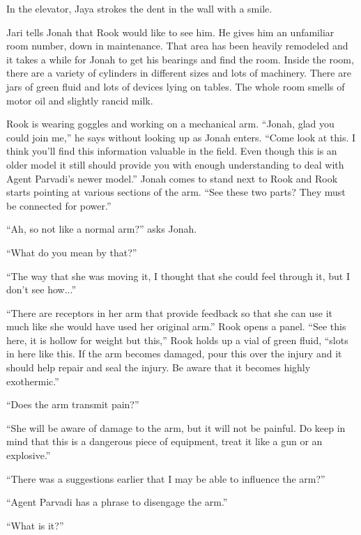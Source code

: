 In the elevator, Jaya strokes the dent in the wall with a smile.





Jari tells Jonah that Rook would like to see him.  He gives him an unfamiliar room number, down in maintenance.  That area has been heavily remodeled and it takes a while for Jonah to get his bearings and find the room.  Inside the room, there are a variety of cylinders in different sizes and lots of machinery.  There are jars of green fluid and lots of devices lying on tables. The whole room smells of motor oil and slightly rancid milk.



Rook is wearing goggles and working on a mechanical arm.  ``Jonah, glad you could join me,'' he says without looking up as Jonah enters.  ``Come look at this.  I think you'll find this information valuable in the field.  Even though this is an older model it still should provide you with enough understanding to deal with Agent Parvadi's newer model.''  Jonah comes to stand next to Rook and Rook starts pointing at various sections of the arm. ``See these two parts?  They must be connected for power.''

``Ah, so not like a normal arm?'' asks Jonah.

``What do you mean by that?''

``The way that she was moving it, I thought that she could feel through it, but I don't see how...''

``There are receptors in her arm that provide feedback so that she can use it much like she would have used her original arm.''  Rook opens a panel. ``See this here, it is hollow for weight but this,'' Rook holds up a vial of green fluid, ``slots in here like this.  If the arm becomes damaged, pour this over the injury and it should help repair and seal the injury.  Be aware that it becomes highly exothermic.''

``Does the arm transmit pain?''

``She will be aware of damage to the arm, but it will not be painful.  Do keep in mind that this is a dangerous piece of equipment, treat it like a gun or an explosive.''

``There was a suggestions earlier that I may be able to influence the arm?''

``Agent Parvadi has a phrase to disengage the arm.''

``What is it?''

